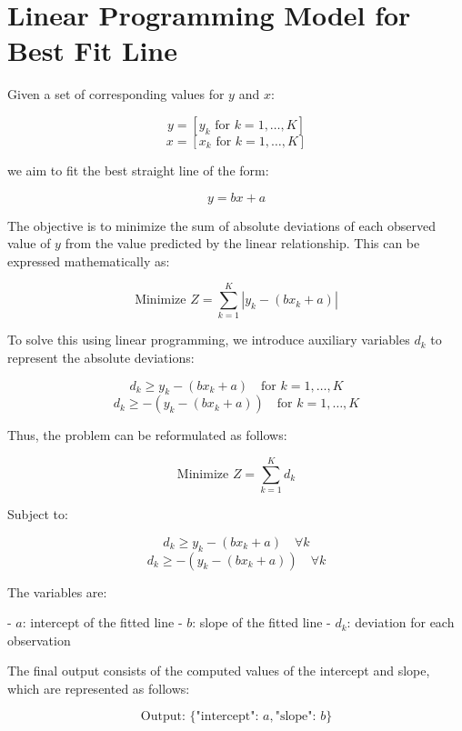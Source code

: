 \documentclass{article}
\begin{document}
\section*{Linear Programming Model for Best Fit Line}

Given a set of corresponding values for \(y\) and \(x\):

\[
y = [y_k \text{ for } k = 1, \ldots, K]
\]
\[
x = [x_k \text{ for } k = 1, \ldots, K]
\]

we aim to fit the best straight line of the form:

\[
y = bx + a
\]

The objective is to minimize the sum of absolute deviations of each observed value of \(y\) from the value predicted by the linear relationship. This can be expressed mathematically as:

\[
\text{Minimize } Z = \sum_{k=1}^{K} |y_k - (bx_k + a)|
\]

To solve this using linear programming, we introduce auxiliary variables \(d_k\) to represent the absolute deviations:

\[
d_k \geq y_k - (bx_k + a) \quad \text{for } k = 1, \ldots, K
\]
\[
d_k \geq -(y_k - (bx_k + a)) \quad \text{for } k = 1, \ldots, K
\]

Thus, the problem can be reformulated as follows:

\[
\text{Minimize } Z = \sum_{k=1}^{K} d_k
\]

Subject to:

\[
d_k \geq y_k - (bx_k + a) \quad \forall k
\]
\[
d_k \geq -(y_k - (bx_k + a)) \quad \forall k
\]

The variables are:

- \(a\): intercept of the fitted line
- \(b\): slope of the fitted line
- \(d_k\): deviation for each observation

The final output consists of the computed values of the intercept and slope, which are represented as follows:

\[
\text{Output: } \{ \text{"intercept": } a, \text{"slope": } b \}
\]
\end{document}

